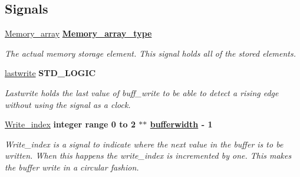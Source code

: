 \subsection*{Signals}
 \begin{DoxyCompactItemize}
\item 
\hypertarget{classADC__buffer_1_1Buffer__ADC_aa3242fe5cbe81a6710bd0ed34005d4ef}{\hyperlink{classADC__buffer_1_1Buffer__ADC_aa3242fe5cbe81a6710bd0ed34005d4ef}{Memory\-\_\-array} {\bfseries {\bfseries \hyperlink{classADC__buffer_1_1Buffer__ADC_a658e2166090ca64ce974029de2840027}{Memory\-\_\-array\-\_\-type}} \textcolor{vhdlchar}{ }} }\label{classADC__buffer_1_1Buffer__ADC_aa3242fe5cbe81a6710bd0ed34005d4ef}

\begin{DoxyCompactList}\small\item\em The actual memory storage element. This signal holds all of the stored elements. \end{DoxyCompactList}\item 
\hypertarget{classADC__buffer_1_1Buffer__ADC_ab722211b6f3f8617f6cf3e17336a0a12}{\hyperlink{classADC__buffer_1_1Buffer__ADC_ab722211b6f3f8617f6cf3e17336a0a12}{lastwrite} {\bfseries \textcolor{comment}{S\-T\-D\-\_\-\-L\-O\-G\-I\-C}\textcolor{vhdlchar}{ }} }\label{classADC__buffer_1_1Buffer__ADC_ab722211b6f3f8617f6cf3e17336a0a12}

\begin{DoxyCompactList}\small\item\em Lastwrite holds the last value of buff\-\_\-write to be able to detect a rising edge without using the signal as a clock. \end{DoxyCompactList}\item 
\hypertarget{classADC__buffer_1_1Buffer__ADC_a8333467b8d5554bb68347610f6060c42}{\hyperlink{classADC__buffer_1_1Buffer__ADC_a8333467b8d5554bb68347610f6060c42}{Write\-\_\-index} {\bfseries \textcolor{comment}{integer}\textcolor{vhdlchar}{ }\textcolor{vhdlkeyword}{range}\textcolor{vhdlchar}{ } \textcolor{vhdldigit}{0} \textcolor{vhdlchar}{ }\textcolor{vhdlchar}{ }\textcolor{vhdlchar}{ }\textcolor{vhdlkeyword}{to}\textcolor{vhdlchar}{ }\textcolor{vhdlchar}{ }\textcolor{vhdlchar}{ } \textcolor{vhdldigit}{2} \textcolor{vhdlchar}{ }\textcolor{vhdlchar}{$\ast$}\textcolor{vhdlchar}{$\ast$}\textcolor{vhdlchar}{ }{\bfseries \hyperlink{classADC__buffer_a2f94b7b31a8914ee23be5e000f89e921}{bufferwidth}} \textcolor{vhdlchar}{ }\textcolor{vhdlchar}{-\/}\textcolor{vhdlchar}{ } \textcolor{vhdldigit}{1} \textcolor{vhdlchar}{ }} }\label{classADC__buffer_1_1Buffer__ADC_a8333467b8d5554bb68347610f6060c42}

\begin{DoxyCompactList}\small\item\em Write\-\_\-index is a signal to indicate where the next value in the buffer is to be written. When this happens the write\-\_\-index is incremented by one. This makes the buffer write in a circular fashion. \end{DoxyCompactList}\end{DoxyCompactItemize}


